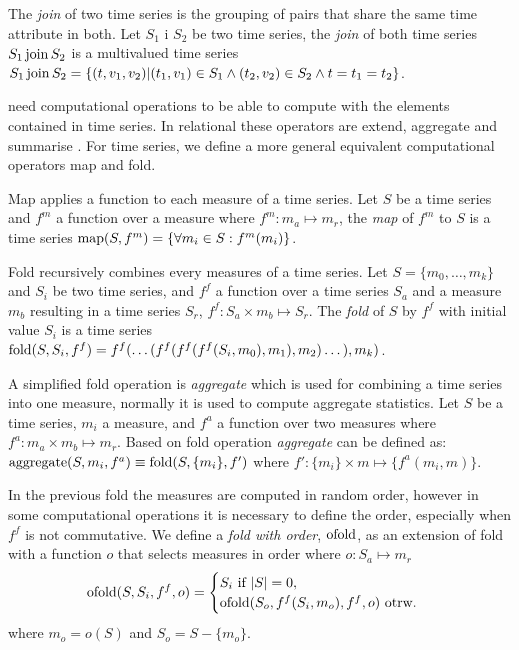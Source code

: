 The \emph{join} of two time series is the grouping of pairs that share
the same time attribute in both.  Let $S_1$ i $S_2$ be two time series,
the \emph{join} of both time series $S_1 \operatorname*{join} S_2$ is a multivalued
time series $S_1 \operatorname*{join} S_2 = \{ (t,v_1,v_2) | (t_1,v_1) \in S_1 \wedge
(t_2,v_2) \in S_2 \wedge t=t_1=t_2 \}$.


 need computational operations to be able to compute with
the elements contained in time series. In relational  these
operators are extend, aggregate and summarise
\cite{date:introduction}. For time series, we define a more general
equivalent computational operators map and fold.


Map applies a function to each measure of a time series.  Let $S$ be a
time series and $f^m$ a function over a measure where $f^m:m_a\mapsto
m_r$, the \emph{map} of $f^m$ to $S$ is a time series $\operatorname*{map}(S,f^m) =
\{\forall m_i\in S : f^m(m_i) \}$.

Fold recursively combines every measures of a time series.  Let
$S=\{m_0, \dotsc, m_k\}$ and $S_i$ be two time series, and $f^f$ a
function over a time series $S_a$ and a measure $m_b$ resulting in a
time series $S_r$, $f^f: S_a \times m_b \mapsto S_r$. The \emph{fold}
of $S$ by $f^f$ with initial value $S_i$ is a time series
$\operatorname*{fold}(S,S_i,f^f) = f^f(\dots( f^f(f^f(f^f(S_i,m_0),\allowbreak
m_1),\allowbreak m_2 )\dots),\allowbreak m_k)$.


A simplified fold operation is \emph{aggregate} which is used for
combining a time series into one measure, normally it is used to
compute aggregate statistics.  Let $S$ be a time series, $m_i$ a
measure, and $f^a$ a function over two measures where $f^a: m_a \times
m_b \mapsto m_r$.  Based on fold operation \emph{aggregate} can be
defined as: $\operatorname*{aggregate}(S,m_i,f^a) \equiv \operatorname*{fold}(S,\{m_i\},f')$ where $f':
\{m_i\} \times m \mapsto \{f^a(m_i,m)\}$.

In the previous fold the measures are computed in random order,
however in some computational operations it is necessary to define the
order, especially when $f^f$ is not commutative. We define a
\emph{fold with order}, $\operatorname*{ofold}$, as an extension of fold with a
function $o$ that selects measures in order where $o: S_a \mapsto m_r$
\[
 \operatorname*{ofold}(S,S_i,f^f,o) =
  \begin{cases}
    S_i  \text{ if } |S|=0, \\
    \operatorname*{ofold}(S_o,f^f(S_i,m_o),f^f,o)  \text{ otrw.}
  \end{cases}
\]
where $m_o = o(S)$ and $S_o = S - \{m_o\}$.


